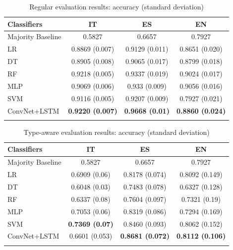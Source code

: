 \documentclass[output=paper,modfonts,nonflat]{langsci/langscibook}
\begin{document}
\begin{table}[!ht]
\caption{Regular evaluation results: accuracy (standard deviation)}
\label{tab:regular}
 \begin{tabular}{lccc} 
  \lsptoprule
   Classifiers & IT & ES & EN  \\
  \midrule
   Majority Baseline & 0.5827 & 0.6657 & 0.7927\\
   LR & 0.8869 (0.007)  & 0.9129 (0.011) & 0.8651 (0.020)  \\
   DT  & 0.8905 (0.008) & 0.9065 (0.017) &  0.8799 (0.018) \\
   RF & 0.9218 (0.005) & 0.9337 (0.019)  &  0.9024 (0.017)\\
   MLP & 0.9069 (0.006) & 0.933 (0.009) &  0.9056 (0.016) \\
   SVM  & 0.9116 (0.005) & 0.9207 (0.009) & 0.7927 (0.021) \\
   ConvNet+LSTM  & \textbf{0.9220 (0.007)} & \textbf{0.9668 (0.01)} & \textbf{0.8860 (0.024)} \\
  \lspbottomrule
 \end{tabular}
\end{table}


\begin{table}[!ht]
\caption{Type-aware evaluation results: accuracy (standard deviation)}
\label{tab:typeaware}
 \begin{tabular}{lccc} 
  \lsptoprule
  Classifiers & IT & ES & EN  \\
  \midrule
   Majority Baseline & 0.5827 & 0.6657 & 0.7927\\
   LR & 0.6909 (0.06)  & 0.8178 (0.074) & 0.8092 (0.149)  \\
   DT  & 0.6048 (0.03) & 0.7483 (0.078) & 0.6327 (0.128) \\
   RF & 0.6337 (0.08) & 0.7604 (0.097) & 0.7321 (0.19) \\
   MLP  & 0.7053 (0.06) & 0.8319 (0.086) & 0.7294 (0.169) \\
   SVM  & \textbf{0.7369 (0.07)} & 0.8460 (0.093) & 0.8062 (0.152) \\
   ConvNet+LSTM  & 0.6601 (0.053) & \textbf{0.8681 (0.072)} & \textbf{0.8112 (0.106)} \\
  \lspbottomrule
 \end{tabular}
\end{table}
\end{document}
